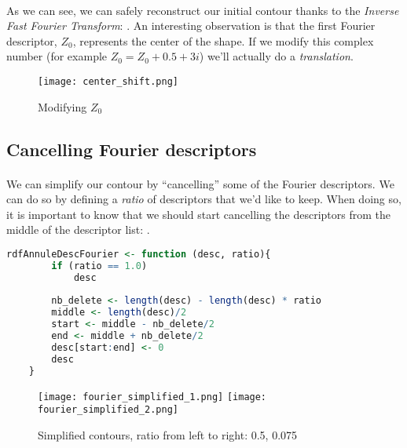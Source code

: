 \paragraph{}
As we can see, we can safely reconstruct our initial contour thanks to the \emph{Inverse Fast Fourier Transform}: \cite[FFT]{fast_fourier_transform}.
An interesting observation is that the first Fourier descriptor, $Z_0$, represents the center of the shape.
If we modify this complex number (for example $Z_0 = Z_0 + 0.5 + 3i$) we'll actually do a \emph{translation}.

\begin{figure}[ht]
    \centering
    \texttt{[image: center\_shift.png]}
    \caption{Modifying $Z_0$}
\end{figure}

\clearpage

\subsection{Cancelling Fourier descriptors}
\paragraph{}
We can simplify our contour by ``cancelling'' some of the Fourier descriptors.
We can do so by defining a \emph{ratio} of descriptors that we'd like to keep.
When doing so, it is important to know that we should start cancelling the descriptors from the middle of the descriptor list: \cite[RDF Course]{lille_rdf_course}.

\begin{lstlisting}[language=R, caption=Simplifying contour]
    rdfAnnuleDescFourier <- function (desc, ratio){
        if (ratio == 1.0)
            desc
        
        nb_delete <- length(desc) - length(desc) * ratio
        middle <- length(desc)/2
        start <- middle - nb_delete/2
        end <- middle + nb_delete/2
        desc[start:end] <- 0
        desc
    }
\end{lstlisting}

\begin{figure}[ht]
    \centering
    \texttt{[image: fourier\_simplified\_1.png]}
    \texttt{[image: fourier\_simplified\_2.png]}
    \caption{Simplified contours, ratio from left to right: 0.5, 0.075}
\end{figure}

\clearpage

